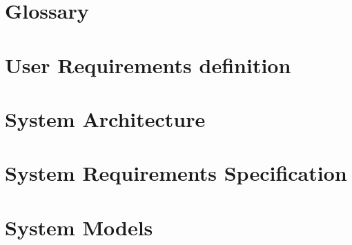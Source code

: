 \documentclass[letterpaper]{article}
\begin{document}
\pagebreak

\section{Glossary}
\lipsum

\section{User Requirements definition}
\lipsum

\section{System Architecture}
\lipsum

\section{System Requirements Specification}
\lipsum
\pagebreak

\section{System Models}
\lipsum

\end{document}
